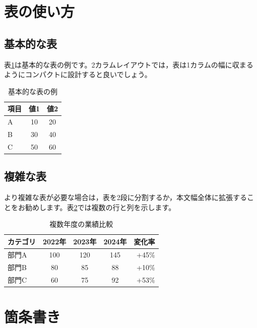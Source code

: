 \documentclass[11pt,a4paper,dvipdfmx,twocolumn]{jarticle}
\begin{document}
\section{表の使い方}

\subsection{基本的な表}

表\ref{tab:example1}は基本的な表の例です。2カラムレイアウトでは，表は1カラムの幅に収まるようにコンパクトに設計すると良いでしょう。

\begin{table}[H]
    \centering
    \small
    \begin{tabular}{lcc}
        \toprule
        項目 & 値1 & 値2 \\
        \midrule
        A  & 10 & 20 \\
        B  & 30 & 40 \\
        C  & 50 & 60 \\
        \bottomrule
    \end{tabular}
    \caption{基本的な表の例}
    \label{tab:example1}
\end{table}

\subsection{複雑な表}

より複雑な表が必要な場合は，表を2段に分割するか，本文幅全体に拡張することをお勧めします。表\ref{tab:example2}では複数の行と列を示します。

\begin{table}[H]
    \centering
    \small
    \begin{tabular}{lcccr}
        \toprule
        カテゴリ & 2022年 & 2023年 & 2024年 & 変化率   \\
        \midrule
        部門A  & 100   & 120   & 145   & +45\% \\
        部門B  & 80    & 85    & 88    & +10\% \\
        部門C  & 60    & 75    & 92    & +53\% \\
        \bottomrule
    \end{tabular}
    \caption{複数年度の業績比較}
    \label{tab:example2}
\end{table}

\section{箇条書き}
\end{document}
